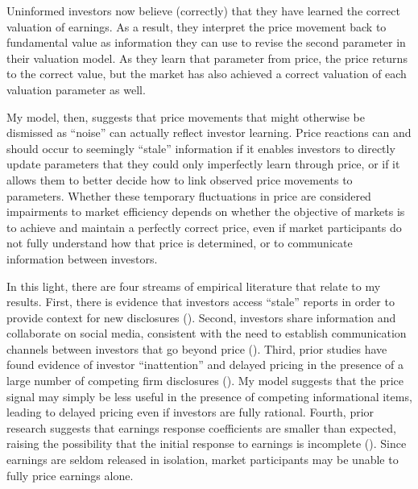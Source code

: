 \documentclass[11pt]{article}
\begin{document}
Uninformed investors now believe (correctly) that they have learned the correct valuation of earnings. As a result, they interpret the price movement back to fundamental value as information they can use to revise the second parameter in their valuation model. As they learn that parameter from price, the price returns to the correct value, but the market has also achieved a correct valuation of each valuation parameter as well.

My model, then, suggests that price movements that might otherwise be dismissed as ``noise'' can actually reflect investor learning. Price reactions can and should occur to seemingly ``stale'' information if it enables investors to directly update parameters that they could only imperfectly learn through price, or if it allows them to better decide how to link observed price movements to parameters. Whether these temporary fluctuations in price are considered impairments to market efficiency depends on whether the objective of markets is to achieve and maintain a perfectly correct price, even if market participants do not fully understand how that price is determined, or to communicate information between investors.

In this light, there are four streams of empirical literature that relate to my results. First, there is evidence that investors access ``stale'' reports in order to provide context for new disclosures (\citet{drakeUsefulnessHistoricalAccounting2016a}). Second, investors share information and collaborate on social media, consistent with the need to establish communication channels between investors that go beyond price (\citet{pasquarielloSpeculationInformationDisclosure2016,chenWisdomCrowdsValue2014,campbellSkinGamePersonal2019}). Third, prior studies have found evidence of investor ``inattention'' and delayed pricing in the presence of a large number of competing firm disclosures (\citet{hirshleiferLimitedAttentionInformation2003}). My model suggests that the price signal may simply be less useful in the presence of competing informational items, leading to delayed pricing even if investors are fully rational. Fourth, prior research suggests that earnings response coefficients are smaller than expected, raising the possibility that the initial response to earnings is incomplete (\citet{kothariCapitalMarketsResearch2001}). Since earnings are seldom released in isolation, market participants may be unable to fully price earnings alone.
\end{document}
